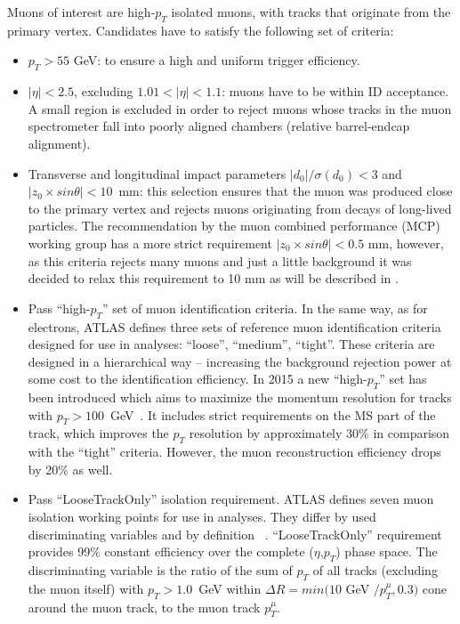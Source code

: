 Muons of interest are high-$p_T$ isolated muons, with tracks that originate
from the primary vertex. Candidates have to satisfy the following set of criteria:
\begin{itemize}
 \item $p_T > 55$ GeV: to ensure a high and uniform trigger efficiency.
 \item $|\eta|<2.5$, excluding $1.01 < |\eta| < 1.1$: muons have to be within ID acceptance. 
 A small region is excluded in order to reject muons whose tracks in the muon spectrometer fall into poorly aligned chambers (relative barrel-endcap alignment).
 \item Transverse and longitudinal impact parameters $|d_0|/\sigma(d_0)<3$ and $|z_0\times sin\theta|<10$~mm: 
 this selection ensures that the muon was produced close to the primary vertex and rejects muons originating from decays of long-lived particles. The recommendation by the muon combined performance (MCP) working group has
 a more strict requirement $|z_0 \times sin \theta| < 0.5$ mm, however, as this criteria rejects many muons and just a little background it  
 was decided to relax this requirement to 10 mm as will be described in .
 \item Pass ``high-$p_T$'' set of muon identification criteria. 
 In the same way, as for electrons, ATLAS defines three sets of reference muon identification criteria designed for use in analyses: ``loose'', ``medium'',  ``tight''. These criteria are designed in a hierarchical way -- increasing the background rejection power at some cost to the identification efficiency.
 In 2015 a new ``high-$p_T$'' set has been introduced which aims to maximize the momentum resolution for tracks with $p_T > 100$~GeV~\cite{muon_performance_2015,ATLAS-CONF-2016-024}.
 It includes strict requirements on the MS part of the track, 
 which improves the $p_T$ resolution by approximately 30$\%$ in comparison with the ``tight'' criteria.  However, the muon reconstruction efficiency drops by 20$\%$ as well.
 \item Pass ``LooseTrackOnly'' isolation requirement.
 ATLAS defines seven muon isolation working points for use in analyses.
 They differ by used discriminating variables and by definition
 ~\cite{muon_performance_2015,ATLAS-CONF-2016-024}.
 ``LooseTrackOnly'' requirement provides 99$\%$ constant efficiency over the complete ($\eta$,$p_T$) phase space.
 The discriminating variable is the ratio of the sum of $p_T$ of all tracks (excluding the muon itself) with $p_T > 1.0$~GeV within $\Delta R = min(10$ GeV $/p_T^{\mu}, 0.3)$ 
 cone around the muon track, to the muon track $p_T^{\mu}$.
\end{itemize}  
 
